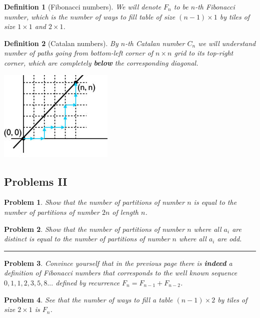\documentclass[11pt,a5paper]{article}
\newtheorem{definition}{Definition}
\newtheorem{problem}{Problem}
\begin{document}
\begin{definition}[Fibonacci numbers]
We will denote $F_n$ to be $n$-th Fibonacci number, which is the number of ways to fill table of size $(n-1) \times 1$ by tiles of size $1 \times 1$ and $2 \times 1$.
\end{definition}

\begin{definition}[Catalan numbers]
By $n$-th Catalan number $C_n$ we will understand number of paths going from bottom-left corner of $n \times n$ grid to its top-right corner, which are completely \textbf{below} the corresponding diagonal.
\end{definition}

\centerline{\includegraphics[scale=0.5]{catalan}}

\break

\subsection*{Problems II}

\begin{problem}
Show that the number of partitions of number $n$ is equal to the number of partitions of number $2n$ of length $n$.
\end{problem}

\begin{problem}
Show that the number of partitions of number $n$ where all $a_i$ are distinct is equal to the number of partitions of number $n$ where all $a_i$ are odd.
\end{problem}

\noindent\rule{\textwidth}{0.4pt}

\begin{problem}
Convince yourself that in the previous page there is \textbf{indeed} a definition of Fibonacci numbers that corresponds to the well known sequence $0,1,1,2,3,5,8...$ defined by recurrence $F_n = F_{n-1} + F_{n-2}$.
\end{problem}

\begin{problem}
See that the number of ways to fill a table $(n-1) \times 2$ by tiles of size $2 \times 1$ is $F_n$.
\end{problem}
\end{document}
